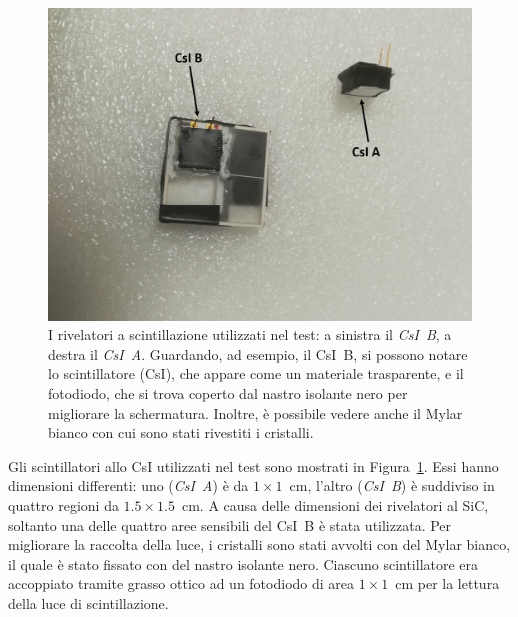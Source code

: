 

\begin{figure} [!t]
	\centering
	\includegraphics[scale=0.5]{Grafici/csi_etichette.png}
	\caption{I rivelatori a scintillazione utilizzati nel test: a sinistra il \emph{CsI~B}, a destra il \emph{CsI~A}. Guardando, ad esempio, il CsI~B, si possono notare lo scintillatore (CsI), che appare come un materiale trasparente, e il fotodiodo, che si trova coperto dal nastro isolante nero per migliorare la schermatura. Inoltre, è possibile vedere anche il Mylar bianco con cui sono stati rivestiti i cristalli.} \label{fig:csi}
\end{figure}



Gli scintillatori allo CsI utilizzati nel test sono mostrati in Figura~\ref{fig:csi}.
Essi hanno dimensioni differenti: uno (\emph{CsI~A}) è da $1 \times 1$~cm, l'altro (\emph{CsI~B}) è suddiviso in quattro regioni da $1.5 \times 1.5$~cm. 
A causa delle dimensioni dei rivelatori al SiC, soltanto una delle quattro aree sensibili del CsI~B è stata utilizzata. Per migliorare la raccolta della luce, i cristalli sono stati avvolti con del Mylar bianco, il quale è stato fissato con del nastro isolante nero.
%
%
Ciascuno scintillatore era accoppiato tramite grasso ottico ad un fotodiodo di area $1 \times 1$~cm per la lettura della luce di scintillazione. 




